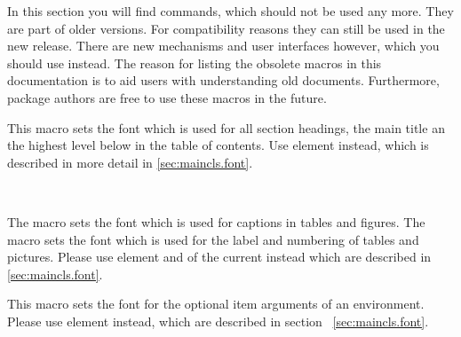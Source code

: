 \begin{Explain}
  In this section you will find commands, which should not be used any
  more. They are part of older \KOMAScript{} versions. For compatibility
  reasons they can still be used in the new \KOMAScript{} release. There
  are new mechanisms and user interfaces however, which you should use
  instead. The reason for listing the obsolete macros in this
  documentation is to aid users with understanding old documents.
  Furthermore, package authors are free to use these macros in the future.

  \begin{Declaration}
  \end{Declaration}
  This macro sets the font which is used for all section headings, the
  main title an the highest level below  in the table of
  contents. Use element  instead, which is
  described in more detail in \autoref{sec:maincls.font}.%

  \begin{Declaration}
     \\
  \end{Declaration}
  The macro  sets the font which is used for captions
  in tables and figures. The macro  sets the font
  which is used for the label and numbering of tables and pictures.
  Please use element  and
   of the current \KOMAScript{} instead
  which are described in \autoref{sec:maincls.font}.%

  \begin{Declaration}
  \end{Declaration}
  This macro sets the font for the optional item arguments of an
   environment. Please use element
   instead, which are described in
  section ~\ref{sec:maincls.font}.%

\end{Explain}

